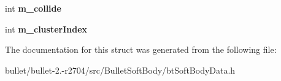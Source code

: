 \begin{DoxyCompactItemize}
\item 
\hypertarget{struct_soft_body_cluster_data_ab04a8dab21722c60a27ebbe8560e436a}{int {\bfseries m\+\_\+collide}}\label{struct_soft_body_cluster_data_ab04a8dab21722c60a27ebbe8560e436a}

\item 
\hypertarget{struct_soft_body_cluster_data_adeec97b03e256449a0e65d6bc1594542}{int {\bfseries m\+\_\+cluster\+Index}}\label{struct_soft_body_cluster_data_adeec97b03e256449a0e65d6bc1594542}

\end{DoxyCompactItemize}


The documentation for this struct was generated from the following file\+:\begin{DoxyCompactItemize}
\item 
bullet/bullet-\/2.-\/r2704/src/\+Bullet\+Soft\+Body/bt\+Soft\+Body\+Data.\+h\end{DoxyCompactItemize}
